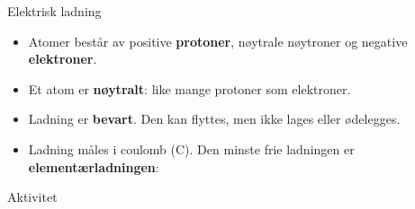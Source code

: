 \documentclass[aspectratio=169, 12pt]{beamer}
\begin{document}
\begin{frame}{Elektrisk ladning}

  \begin{itemize}
    \item<1-> Atomer består av positive \textbf{protoner}, nøytrale nøytroner og negative \textbf{elektroner}.
    \item<2-> Et atom er \textbf{nøytralt}: like mange protoner som elektroner.
    \item<3-> Ladning er \textbf{bevart}. Den kan flyttes, men ikke lages eller ødelegges.
    \item<4-> Ladning måles i coulomb (C). Den minste frie ladningen er \textbf{elementærladningen}:
  \end{itemize}

\end{frame}

\begin{frame}{Aktivitet}


\end{frame}
\end{document}
